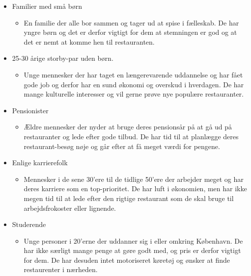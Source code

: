 \documentclass[a4paper, 12pt]{article}
\begin{document}
\begin{itemize}
  \item Familier med små børn
  \begin{itemize}
    \item En familie der alle bor sammen og tager ud at spise i fælleskab. De har yngre børn og det er derfor vigtigt for dem at stemningen er god og at det er nemt at komme hen til restauranten.
  \end{itemize}
  \item 25-30 årige storby-par uden børn.
  \begin{itemize}
    \item Unge mennesker der har taget en længerevarende uddannelse og har fået gode job og derfor har en sund økonomi og overskud i hverdagen. De har mange kulturelle interesser og vil gerne prøve nye populære restauranter.
  \end{itemize}
  \item Pensionister
 \begin{itemize}
    \item Ældre mennesker der nyder at bruge deres pensionsår på at gå ud på restauranter og lede efter gode tilbud. De har tid til at planlægge deres restaurant-besøg nøje og går efter at få meget værdi for pengene.
  \end{itemize}
  \item Enlige karrierefolk
 \begin{itemize}
    \item Mennesker i de sene 30'ere til de tidlige 50'ere der arbejder meget og har deres karriere som en top-prioritet. De har luft i økonomien, men har ikke megen tid til at lede efter den rigtige restaurant som de skal bruge til arbejdsfrokoster eller lignende.
  \end{itemize}
  \item Studerende
 \begin{itemize}
    \item Unge personer i 20'erne der uddanner sig i eller omkring
      København. De har ikke særligt mange penge at gøre godt med, og
      pris er derfor vigtigt for dem. De har desuden intet motoriseret
      køretøj og ønsker at finde restaurenter i nærheden.
  \end{itemize}
\end{itemize}

\clearpage
\appendix

\printbibliography[heading=bibnumbered,title=Litteraturliste]
\end{document}
